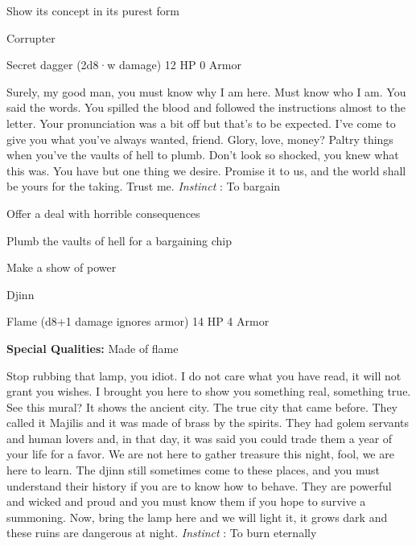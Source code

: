 \startitemize[1,packed]

\item Show its concept in its purest form


\stopitemize
 
\startMonsterName
Corrupter	 
\stopMonsterName
 

Secret dagger (2d8·w damage)	12 HP	0 Armor

 


 
\startMonsterDescription
Surely, my good man, you must know why I am here. Must know who I am. You said the words. You spilled the blood and followed the instructions almost to the letter. Your pronunciation was a bit off but that’s to be expected. I’ve come to give you what you’ve always wanted, friend. Glory, love, money? Paltry things when you’ve the vaults of hell to plumb. Don’t look so shocked, you knew what this was. You have but one thing we desire. Promise it to us, and the world shall be yours for the taking. Trust me. {\em Instinct} : To bargain
\stopMonsterDescription
 
\startitemize[1,packed]

\item Offer a deal with horrible consequences

 
\item Plumb the vaults of hell for a bargaining chip

 
\item Make a show of power


\stopitemize
 
\startMonsterName
Djinn	 
\stopMonsterName
 

Flame (d8+1 damage ignores armor)	14 HP	4 Armor

 


 
\startMonsterQualities
{\bf Special Qualities:}  Made of flame
\stopMonsterQualities
 
\startMonsterDescription
Stop rubbing that lamp, you idiot. I do not care what you have read, it will not grant you wishes. I brought you here to show you something real, something true. See this mural? It shows the ancient city. The true city that came before. They called it Majilis and it was made of brass by the spirits. They had golem servants and human lovers and, in that day, it was said you could trade them a year of your life for a favor. We are not here to gather treasure this night, fool, we are here to learn. The djinn still sometimes come to these places, and you must understand their history if you are to know how to behave. They are powerful and wicked and proud and you must know them if you hope to survive a summoning. Now, bring the lamp here and we will light it, it grows dark and these ruins are dangerous at night. {\em Instinct} : To burn eternally
\stopMonsterDescription
 
